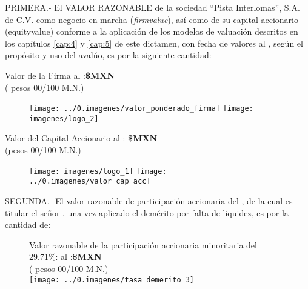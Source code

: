 \textcolor{principal}{\underline{PRIMERA.-}} El \textcolor{principal}{VALOR RAZONABLE} de la sociedad \textcolor{principal}{``Pista Interlomas'', S.A. de C.V.} como negocio en marcha (\textit{\gls{firmvalue}}), as\'i como de su capital accionario (\gls{equityvalue}) conforme a la aplicaci\'on de los modelos de valuaci\'on descritos en los cap\'itulos \ref{cap:4} y \ref{cap:5}  de este dictamen, con fecha de valores al \fechaValores, seg\'un el prop\'osito y uso del aval\'uo, es por la siguiente cantidad:\\
\begin{center}
\textcolor{principal}{Valor de la Firma al \fechaValoresCorto:}\textbf{\$\valorFirma MXN}\\

(\textcolor{secundario}{\valorFirmaLetra{} pesos 00/100 M.N.})

\begin{figure}[H]
\centering
\texttt{[image: ../0.imagenes/valor\_ponderado\_firma]}\hspace{.5cm} \texttt{[image: imagenes/logo\_2]}\\
\end{figure}


\textcolor{principal}{Valor del Capital Accionario al \fechaValoresCorto:} \textbf{\$\valorCapital MXN}\\
(\textcolor{secundario}{\valorCapitalLetra pesos 00/100 M.N.})\\
\end{center}

\begin{figure}[H]
\centering
\texttt{[image: imagenes/logo\_1]}\hspace{2.1cm} \texttt{[image: ../0.imagenes/valor\_cap\_acc]}

\end{figure}
\espacio{.5cm}

\textcolor{principal}{\underline{SEGUNDA.-}} El valor razonable de participaci\'on accionaria del \capitalAccionario, de la cual es titular el se\~nor \nombrePropietario, una vez aplicado el dem\'erito por falta de liquidez, es por la cantidad de:

\begin{figure}[H]
\centering
\textcolor{principal}{Valor razonable de la participación accionaria minoritaria del 29.71\%:  al \fechaValoresCorto:}\textbf{\$\valorIliquidez MXN}\\

(\textcolor{secundario}{\valorIliquidezLetra{} pesos 00/100 M.N.})\\


\texttt{[image: ../0.imagenes/tasa\_demerito\_3]}

\end{figure} 


\vspace{2cm}